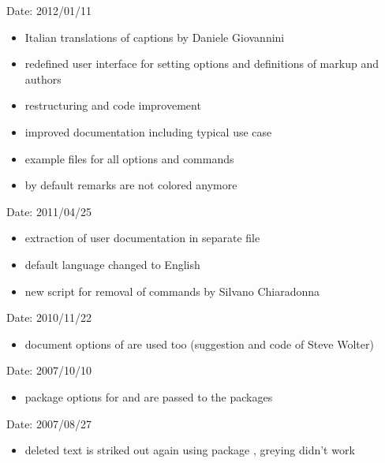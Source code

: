 
Date: 2012/01/11
\begin{itemize}
	\item Italian translations of captions by Daniele Giovannini
	\item redefined user interface for setting options and definitions of markup and authors
	\item restructuring and code improvement
	\item improved documentation including typical use case
	\item example files for all options and commands
	\item by default remarks are not colored anymore
\end{itemize}


Date: 2011/04/25
\begin{itemize}
	\item extraction of user documentation in separate file
	\item default language changed to English
	\item new script for removal of  commands by Silvano Chiaradonna
\end{itemize}


Date: 2010/11/22
\begin{itemize}
	\item document options of  are used too (suggestion and code of Steve Wolter)
\end{itemize}


Date: 2007/10/10
\begin{itemize}
	\item package options for  and  are passed to the packages
\end{itemize}


Date: 2007/08/27
\begin{itemize}
	\item deleted text is striked out again using package , greying didn't work
\end{itemize}


